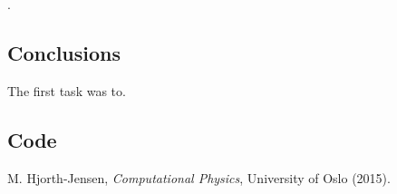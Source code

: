 \documentclass[11pt]{article}
\begin{document}


    .


\subsection{Conclusions}

    The first task was to.

\subsection{Code}

    

    

    

\begin{thebibliography}{1}

    M. Hjorth-Jensen, {\em Computational Physics}, University of Oslo (2015). 

\end{thebibliography}
\end{document}

